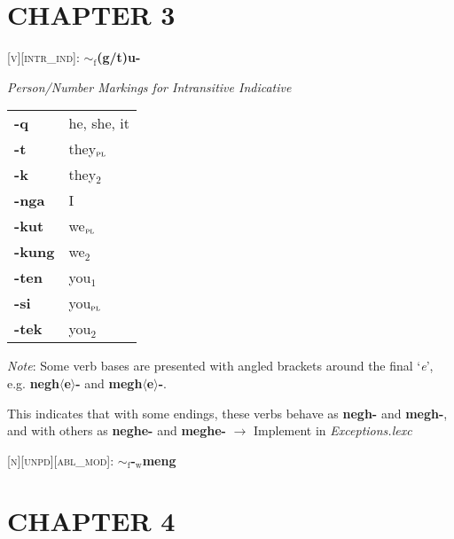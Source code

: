 \documentclass{article}
\begin{document}
\section*{CHAPTER 3}

\noindent \textsc{[v][intr\_ind]}: \textbf{${\sim}_\text{f}$(g/t)u-}

\bigskip

\textit{Person/Number Markings for Intransitive Indicative}

\begin{tabular}{ l l }
\textbf{-q} & he, she, it \\
\textbf{-t} & they$_\text{\textsc{pl}}$ \\
\textbf{-k} & they$_\text{2}$ \\
\textbf{-nga} & I \\
\textbf{-kut} & we$_\text{\textsc{pl}}$ \\
\textbf{-kung} & we$_\text{2}$ \\
\textbf{-ten} & you$_\text{1}$ \\
\textbf{-si} & you$_\text{\textsc{pl}}$ \\
\textbf{-tek} & you$_\text{2}$
\end{tabular}

\bigskip

\textit{Note}: Some verb bases are presented with angled brackets around the final `\textit{e}', e.g. \textbf{negh$\langle$e$\rangle$-} and \textbf{megh$\langle$e$\rangle$-}.

This indicates that with some endings, these verbs behave as \textbf{negh-} and \textbf{megh-}, and with others as \textbf{neghe-} and \textbf{meghe-} $\rightarrow$ Implement in \textit{Exceptions.lexc}

\bigskip

\textsc{[n][unpd][abl\_mod]}: \textbf{$\sim_\text{f}$-$_\text{w}$meng}

\section*{CHAPTER 4}
\end{document}
